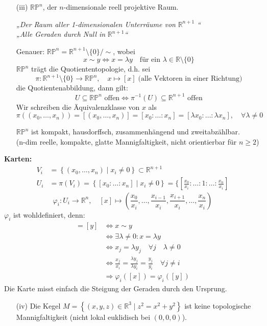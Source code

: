 \documentclass[fleqn, 12pt, letterpaper]{article}
\newcommand{\txt}[1]{\text{#1}}
\begin{document}
 \begin{itemize}
    \item[(iii)] $\mathbb{RP}^n$, der $n$-dimensionale reell projektive Raum.

    \textit{„Der Raum aller 1-dimensionalen Unterräume von } $\mathbb{R}^{n+1}$ \textit{“} \\
    \textit{„Alle Geraden durch Null in} $\mathbb{R}^{n+1}$\textit{“}

    \medskip

    Genauer: $\mathbb{RP}^n = \mathbb{R}^{n+1}  \setminus \{0\} / \sim$, wobei
    \[
    x \sim y \iff x = \lambda y \quad \text{für ein } \lambda \in \mathbb{R} \setminus \{0\}
    \]
    $\mathbb{RP}^n$ trägt die Quotiententopologie, d.h. sei
    \[
    \pi : \mathbb{R}^{n+1} \setminus \{0\} \longrightarrow \mathbb{RP}^n,\quad x \mapsto [x] \;\txt{(alle Vektoren in einer Richtung)}
    \]
    die Quotientenabbildung, dann gilt:
    \[
    U \subseteq \mathbb{RP}^n \text{ offen} \iff \pi^{-1}(U) \subseteq \mathbb{R}^{n+1} \text{ offen}
    \]
    Wir schreiben die Äquivalenzklasse von $x$ als
    \[
    \pi((x_0, \ldots, x_n)) = [(x_0, \ldots, x_n)] = [x_0 : \ldots : x_n] = [\lambda x_0 : \ldots : \lambda x_n], \quad \forall \lambda \neq 0
    \]

    \medskip

    $\mathbb{RP}^n$ ist kompakt, hausdorffsch, zusammenhängend und zweitabzählbar. \\
    (n-dim reelle, kompakte, glatte Mannigfaltigkeit, nicht orientierbar für $n\geqslant 2$)
\end{itemize}
\textbf{Karten:}
\begin{align*}
V_i &= \left\{ (x_0, \ldots, x_n) \mid x_i \neq 0 \right\} \subset \mathbb{R}^{n+1} \\
U_i &= \pi(V_i) = \left\{ [x_0 : \ldots : x_n] \mid x_i \neq 0 \right\}=\{[\frac{x_0}{x_i}:\dots:1:\dots:\frac{x_n}{x_i}]
\end{align*}
\[
\varphi_i : U_i \to \mathbb{R}^n, \quad [x] \mapsto \left( \frac{x_0}{x_i}, \ldots, \frac{x_{i-1}}{x_i}, \frac{x_{i+1}}{x_i}, \ldots, \frac{x_n}{x_i} \right)
\]
$\varphi_i$ ist wohldefiniert, denn:
\begin{align*}
[x] = [y] &\iff x \sim y \\
&\iff \exists \lambda \neq 0 : x = \lambda y \\
&\iff x_j = \lambda y_j \quad \forall j \quad\lambda \neq0\\\
&\iff \frac{x_j}{x_i} = \frac{\lambda y_j}{\lambda y_i} = \frac{y_j}{y_i} \quad \forall j \neq i \\
&\Rightarrow \varphi_i([x]) = \varphi_i([y])
\end{align*}
Die Karte misst einfach die Steigung der Geraden durch den Ursprung.
\begin{itemize}
	\item[(iv)] Die Kegel \(M = \left\{ (x, y, z) \in \mathbb{R}^3 \mid z^2 = x^2 + y^2 \right\}\) ist keine topologische Mannigfaltigkeit (nicht lokal euklidisch bei $(0,0,0)$).
\end{itemize}
\end{document}
